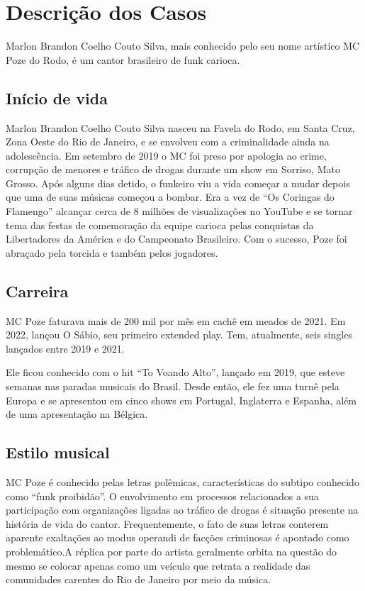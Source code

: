 \chapter{Descrição dos Casos}
\label{chap4}

Marlon Brandon Coelho Couto Silva, mais conhecido pelo seu nome artístico MC Poze do Rodo, é um cantor brasileiro de funk carioca.

\section{Início de vida}

Marlon Brandon Coelho Couto Silva nasceu na Favela do Rodo, em Santa Cruz, Zona Oeste do Rio de Janeiro, e se envolveu com a criminalidade ainda na adolescência. Em setembro de 2019 o MC foi preso por apologia ao crime, corrupção de menores e tráfico de drogas durante um show em Sorriso, Mato Grosso. Após alguns dias detido, o funkeiro viu a vida começar a mudar depois que uma de suas músicas começou a bombar. Era a vez de ``Os Coringas do Flamengo'' alcançar cerca de 8 milhões de visualizações no YouTube e se tornar tema das festas de comemoração da equipe carioca pelas conquistas da Libertadores da América e do Campeonato Brasileiro. Com o sucesso, Poze foi abraçado pela torcida e também pelos jogadores.

\section{Carreira}

MC Poze faturava mais de 200 mil por mês em cachê em meados de 2021. Em 2022, lançou O Sábio, seu primeiro extended play. Tem, atualmente, seis singles lançados entre 2019 e 2021.

Ele ficou conhecido com o hit ``To Voando Alto'', lançado em 2019, que esteve semanas nas paradas musicais do Brasil. Desde então, ele fez uma turnê pela Europa e se apresentou em cinco shows em Portugal, Inglaterra e Espanha, além de uma apresentação na Bélgica.

\section{Estilo musical}

MC Poze é conhecido pelas letras polêmicas, características do subtipo conhecido como ``funk proibidão''. O envolvimento em processos relacionados a sua participação com organizações ligadas ao tráfico de drogas é situação presente na história de vida do cantor. Frequentemente, o fato de suas letras conterem aparente exaltações ao modus operandi de facções criminosas é apontado como problemático.A réplica por parte do artista geralmente orbita na questão do mesmo se colocar apenas como um veículo que retrata a realidade das comunidades carentes do Rio de Janeiro por meio da música.
